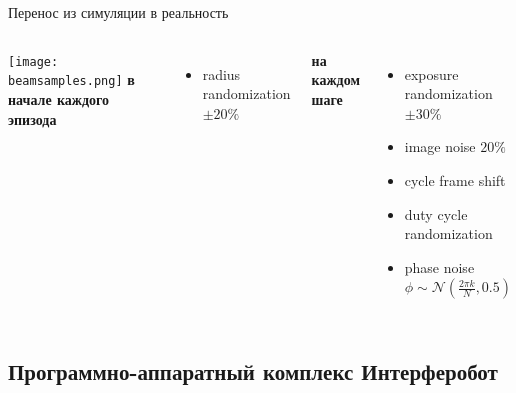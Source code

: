 \begin{frame}{Перенос из симуляции в реальность}
\begin{columns}
\centering
\texttt{[image: beamsamples.png]}
\textbf{в начале каждого эпизода}
\begin{itemize}
    \item radius randomization $\pm 20\%$
\end{itemize}
\textbf{на каждом шаге}
\begin{itemize}
    \item exposure randomization $\pm 30\%$
    \item image noise $20\%$
    \item cycle frame shift
    \item duty cycle randomization
    \item phase noise $\phi \sim \mathcal{N}(\frac{2\pi k}{N}, 0.5)$
\end{itemize}
\end{columns}
\end{frame}

\subsection{Программно-аппаратный комплекс Интерферобот}

